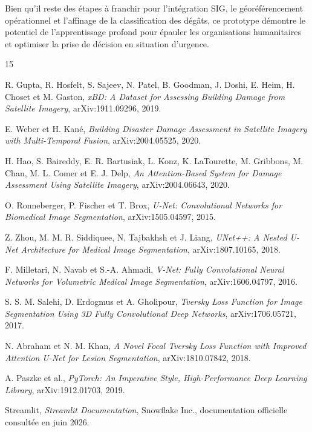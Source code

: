 \documentclass[french,12pt]{article}
\begin{document}
Bien qu'il reste des étapes à franchir pour l'intégration SIG, le géoréférencement opérationnel et l'affinage de la classification des dégâts, ce prototype démontre le potentiel de l'apprentissage profond pour épauler les organisations humanitaires et optimiser la prise de décision en situation d'urgence.

\newpage

\begin{thebibliography}{15}

R. Gupta, R. Hosfelt, S. Sajeev, N. Patel, B. Goodman, J. Doshi, E. Heim, H. Choset et M. Gaston,
\textit{xBD: A Dataset for Assessing Building Damage from Satellite Imagery},
arXiv:1911.09296, 2019.

E. Weber et H. Kané,
\textit{Building Disaster Damage Assessment in Satellite Imagery with Multi-Temporal Fusion},
arXiv:2004.05525, 2020.

H. Hao, S. Baireddy, E. R. Bartusiak, L. Konz, K. LaTourette, M. Gribbons, M. Chan, M. L. Comer et E. J. Delp,
\textit{An Attention-Based System for Damage Assessment Using Satellite Imagery},
arXiv:2004.06643, 2020.

O. Ronneberger, P. Fischer et T. Brox,
\textit{U-Net: Convolutional Networks for Biomedical Image Segmentation},
arXiv:1505.04597, 2015.

Z. Zhou, M. M. R. Siddiquee, N. Tajbakhsh et J. Liang,
\textit{UNet++: A Nested U-Net Architecture for Medical Image Segmentation},
arXiv:1807.10165, 2018.

F. Milletari, N. Navab et S.-A. Ahmadi,
\textit{V-Net: Fully Convolutional Neural Networks for Volumetric Medical Image Segmentation},
arXiv:1606.04797, 2016.

S. S. M. Salehi, D. Erdogmus et A. Gholipour,
\textit{Tversky Loss Function for Image Segmentation Using 3D Fully Convolutional Deep Networks},
arXiv:1706.05721, 2017.

N. Abraham et N. M. Khan,
\textit{A Novel Focal Tversky Loss Function with Improved Attention U-Net for Lesion Segmentation},
arXiv:1810.07842, 2018.

A. Paszke et al.,
\textit{PyTorch: An Imperative Style, High-Performance Deep Learning Library},
arXiv:1912.01703, 2019.

Streamlit,
\textit{Streamlit Documentation},
Snowflake Inc., documentation officielle consultée en juin 2026.


\end{thebibliography}
\end{document}
